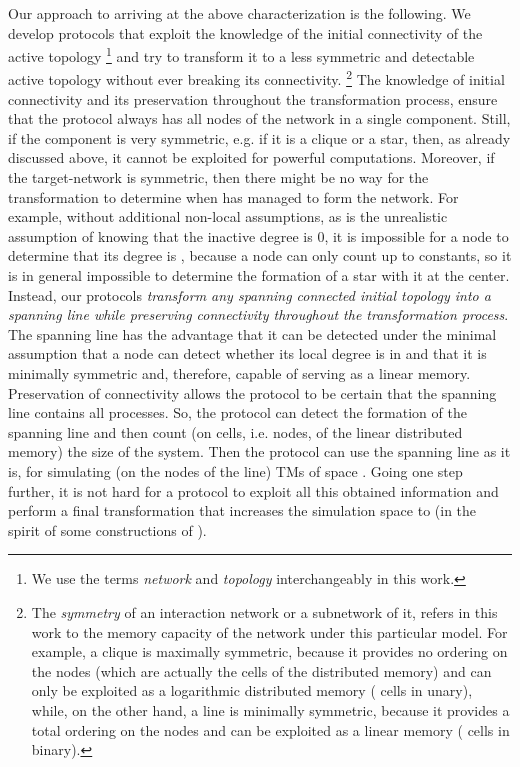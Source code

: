 \documentclass[preprint]{elsarticle}
\begin{document}
Our approach to arriving at the above characterization is the following. We develop protocols that exploit the knowledge of the initial connectivity of the active topology \footnote{We use the terms \emph{network} and \emph{topology} interchangeably in this work.} and try to transform it to a less symmetric and detectable active topology without ever breaking its connectivity. \footnote{The \emph{symmetry} of an interaction network or a subnetwork of it, refers in this work to the memory capacity of the network under this particular model. For example, a clique is maximally symmetric, because it provides no ordering on the nodes (which are actually the cells of the distributed memory) and can only be exploited as a logarithmic distributed memory ( cells in unary), while, on the other hand, a line is minimally symmetric, because it provides a total ordering on the nodes and can be exploited as a linear memory ( cells in binary).} The knowledge of initial connectivity and its preservation throughout the transformation process, ensure that the protocol always has all nodes of the network in a single component. Still, if the component is very symmetric, e.g. if it is a clique or a star, then, as already discussed above, it cannot be exploited for powerful computations. Moreover, if the target-network is symmetric, then there might be no way for the transformation to determine when has managed to form the network. For example, without additional non-local assumptions, as is the unrealistic assumption of knowing that the inactive degree is 0, it is impossible for a node to determine that its degree is , because a node can only count up to constants, so it is in general impossible to determine the formation of a star with it at the center. Instead, our protocols \emph{transform any spanning connected initial topology into a spanning line while preserving connectivity throughout the transformation process}. The spanning line has the advantage that it can be detected under the minimal assumption that a node can detect whether its local degree is in  and that it is minimally symmetric and, therefore, capable of serving as a linear memory. Preservation of connectivity allows the protocol to be certain that the spanning line contains all processes. So, the protocol can detect the formation of the spanning line and then count (on  cells, i.e. nodes, of the linear distributed memory) the size of the system. Then the protocol can use the spanning line as it is, for simulating (on the nodes of the line) TMs of space . Going one step further, it is not hard for a protocol to exploit all this obtained information and perform a final transformation that increases the simulation space to  (in the spirit of some constructions of \cite{MS14}).
\end{document}
